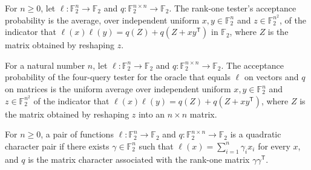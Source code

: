 \begin{definition}
\label{FABL.quadraticPairRankOneAcceptanceProbability}
\leanok
{}
For $n\ge 0$, let $\ell:\mathbb F_2^n\to\mathbb F_2$ and $q:\mathbb F_2^{n\times
n}\to\mathbb F_2$. The rank-one tester's acceptance probability is the average, over
independent uniform $x,y\in\mathbb F_2^n$ and $z\in\mathbb F_2^{n^2}$, of the indicator
that $\ell(x)\ell(y)=q(Z)+q(Z+xy^{\mathsf T})$ in $\mathbb F_2$, where $Z$ is the matrix
obtained by reshaping $z$.
\end{definition}

\begin{theorem}
\label{FABL.quadraticPairRankOneTester_acceptanceProbability}
\leanok
{}
For a natural number $n$, let $\ell:\mathbb F_2^n\to\mathbb F_2$ and $q:\mathbb
F_2^{n\times n}\to\mathbb F_2$. The acceptance probability of the four-query tester for
the oracle that equals $\ell$ on vectors and $q$ on matrices is the uniform average over
independent uniform $x,y\in\mathbb F_2^n$ and $z\in\mathbb F_2^{n^2}$ of the indicator
that $\ell(x)\ell(y)=q(Z)+q(Z+xy^{\mathsf T})$, where $Z$ is the matrix obtained by
reshaping $z$ into an $n\times n$ matrix.
\end{theorem}

\begin{definition}
\label{FABL.IsQuadraticCharacterPair}
\leanok
{}
For $n\ge 0$, a pair of functions $\ell:\mathbb F_2^n\to\mathbb F_2$ and $q:\mathbb
F_2^{n\times n}\to\mathbb F_2$ is a quadratic character pair if there exists
$\gamma\in\mathbb F_2^n$ such that $\ell(x)=\sum_{i=1}^n\gamma_i x_i$ for every $x$, and
$q$ is the matrix character associated with the rank-one matrix $\gamma\gamma^{\mathsf
T}$.
\end{definition}

